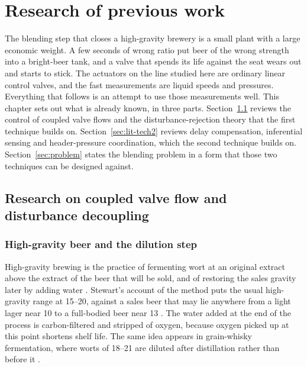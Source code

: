 \chapter{Research of previous work}
\label{ch:review}

The blending step that closes a high-gravity brewery is a small plant with a large economic weight. A few seconds of wrong ratio put beer of the wrong strength into a bright-beer tank, and a valve that spends its life against the seat wears out and starts to stick. The actuators on the line studied here are ordinary linear control valves, and the fast measurements are liquid speeds and pressures. Everything that follows is an attempt to use those measurements well. This chapter sets out what is already known, in three parts. Section~\ref{sec:lit-tech1} reviews the control of coupled valve flows and the disturbance-rejection theory that the first technique builds on. Section~\ref{sec:lit-tech2} reviews delay compensation, inferential sensing and header-pressure coordination, which the second technique builds on. Section~\ref{sec:problem} states the blending problem in a form that those two techniques can be designed against.

\section{Research on coupled valve flow and disturbance decoupling}
\label{sec:lit-tech1}

\subsection{High-gravity beer and the dilution step}

High-gravity brewing is the practice of fermenting wort at an original extract above the extract of the beer that will be sold, and of restoring the sales gravity later by adding water \cite{stewart2010highgravity,kunze2014brewing,briggs2004brewing}. Stewart's account of the method puts the usual high-gravity range at \SIrange{15}{20}{\plato}, against a sales beer that may lie anywhere from a light lager near \SI{10}{\plato} to a full-bodied beer near \SI{13}{\plato} \cite{stewart2010highgravity}. The water added at the end of the process is carbon-filtered and stripped of oxygen, because oxygen picked up at this point shortens shelf life. The same idea appears in grain-whisky fermentation, where worts of \SIrange{18}{21}{\plato} are diluted after distillation rather than before it \cite{stewart2010highgravity,stewart1997recent}.

